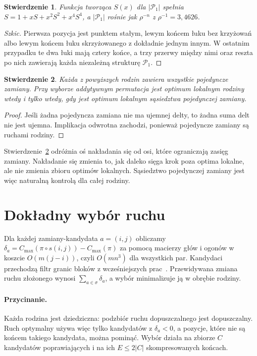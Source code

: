 \documentclass[10pt,twocolumn]{article}
\newtheorem{proposition}{Stwierdzenie}
\newcommand{\Pa}{\mathcal{P}}
\begin{document}
\begin{proposition}\label{prop:pa1}
Funkcja tworząca $S(x)$ dla $|\Pa_1|$ spełnia
$S=1+xS+x^2S^2+x^4S^4$, a $|\Pa_1|$ rośnie jak $\rho^{-n}$ z
$\rho^{-1}=3{,}4626$.
\end{proposition}
\begin{proof}[Szkic]
Pierwsza pozycja jest punktem stałym, lewym końcem łuku bez krzyżowań
albo lewym końcem łuku skrzyżowanego z dokładnie jednym innym. W ostatnim
przypadku te dwa łuki mają cztery końce, a trzy przerwy między nimi oraz
reszta po nich zawierają każda niezależną strukturę $\Pa_1$.
\end{proof}

\begin{proposition}\label{prop:optima}
Każda z powyższych rodzin zawiera wszystkie pojedyncze zamiany. Przy
wyborze addytywnym permutacja jest optimum lokalnym rodziny wtedy
i tylko wtedy, gdy jest optimum lokalnym sąsiedztwa pojedynczej zamiany.
\end{proposition}
\begin{proof}
Jeśli żadna pojedyncza zamiana nie ma ujemnej delty, to żadna suma delt nie
jest ujemna. Implikacja odwrotna zachodzi, ponieważ pojedyncze zamiany są
ruchami rodziny.
\end{proof}

Stwierdzenie~\ref{prop:optima} odróżnia oś nakładania się od osi, które
ograniczają zasięg zamiany. Nakładanie się zmienia to, jak daleko sięga
krok poza optima lokalne, ale nie zmienia zbioru optimów lokalnych.
Sąsiedztwo pojedynczej zamiany jest więc naturalną kontrolą dla całej
rodziny.

\section{Dokładny wybór ruchu}\label{sec:selection}

Dla każdej zamiany-kandydata $a=(i,j)$ obliczamy
$\delta_a=C_{\max}(\pi\circ s(i,j))-C_{\max}(\pi)$ za pomocą macierzy
głów i ogonów w koszcie $O(m(j-i))$, czyli $O(mn^3)$ dla wszystkich par.
Kandydaci przechodzą filtr granic bloków z wcześniejszych
prac~\cite{windowed_own}. Przewidywana zmiana ruchu złożonego wynosi
$\sum_{a\in\sigma}\delta_a$, a wybór minimalizuje ją w obrębie rodziny.

\paragraph{Przycinanie.} Każda rodzina jest dziedziczna: podzbiór ruchu
dopuszczalnego jest dopuszczalny. Ruch optymalny używa więc tylko
kandydatów z $\delta_a<0$, a pozycje, które nie są końcem takiego
kandydata, można pominąć. Wybór działa na zbiorze $C$ kandydatów
poprawiających i na ich $E\leq 2|C|$ skompresowanych końcach.
\end{document}
